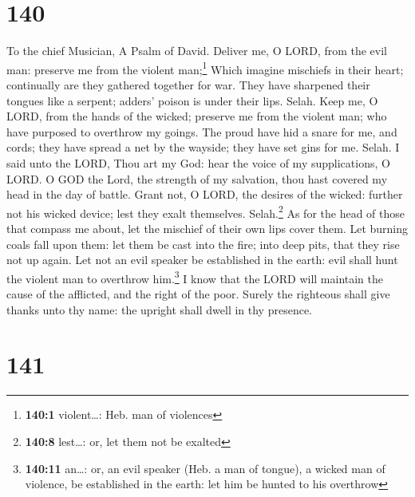 \hypertarget{section-141}{%
\section{140}\label{section-141}}

To the chief Musician, A Psalm of David.  Deliver me, O
LORD, from the evil man: preserve me from the violent man;\footnote{\textbf{140:1}
  violent\ldots: Heb. man of violences}  Which imagine
mischiefs in their heart; continually are they gathered together for
war.  They have sharpened their tongues like a serpent;
adders' poison is under their lips. Selah.  Keep me, O
LORD, from the hands of the wicked; preserve me from the violent man;
who have purposed to overthrow my goings.  The proud have
hid a snare for me, and cords; they have spread a net by the wayside;
they have set gins for me. Selah.  I said unto the LORD,
Thou art my God: hear the voice of my supplications, O LORD.
 O GOD the Lord, the strength of my salvation, thou hast
covered my head in the day of battle.  Grant not, O LORD,
the desires of the wicked: further not his wicked device; lest they
exalt themselves. Selah.\footnote{\textbf{140:8} lest\ldots: or, let
  them not be exalted}  As for the head of those that
compass me about, let the mischief of their own lips cover them.
 Let burning coals fall upon them: let them be cast into
the fire; into deep pits, that they rise not up again. 
Let not an evil speaker be established in the earth: evil shall hunt the
violent man to overthrow him.\footnote{\textbf{140:11} an\ldots: or, an
  evil speaker (Heb. a man of tongue), a wicked man of violence, be
  established in the earth: let him be hunted to his overthrow}
 I know that the LORD will maintain the cause of the
afflicted, and the right of the poor.  Surely the
righteous shall give thanks unto thy name: the upright shall dwell in
thy presence.

\hypertarget{section-142}{%
\section{141}\label{section-142}}

